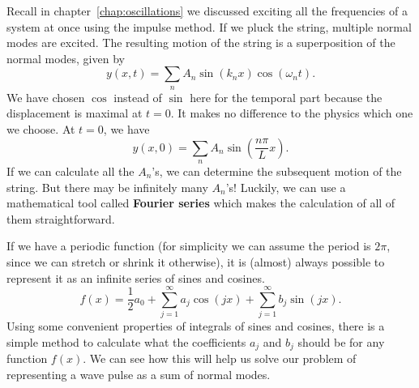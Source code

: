 \documentclass[../classical_mechanics.tex]{subfiles}
\begin{document}
        Recall in chapter~\ref{chap:oscillations} we discussed exciting all the frequencies of a system at once using the impulse method.
        If we pluck the string, multiple normal modes are excited.
        The resulting motion of the string is a superposition of the normal modes, given by
        \begin{equation}
            y(x,t)=\sum_n A_n\sin(k_n x)\cos(\omega_n t).
        \end{equation}
        We have chosen $\cos$ instead of $\sin$ here for the temporal part because the displacement is maximal at $t=0$.
        It makes no difference to the physics which one we choose.
        At $t=0$, we have
        \begin{equation}\label{eq:waves:plucked-string-initial-conditions}
            y(x,0)=\sum_n A_n\sin\left(\frac{n\pi}{L}x\right).
        \end{equation}
        If we can calculate all the $A_n$'s, we can determine the subsequent motion of the string.
        But there may be infinitely many $A_n$'s!
        Luckily, we can use a mathematical tool called \textbf{Fourier series} which makes the calculation of all of them straightforward.

        If we have a periodic function (for simplicity we can assume the period is $2\pi$, since we can stretch or shrink it otherwise), it is (almost) always possible to represent it as an infinite series of sines and cosines.
        \begin{equation}\label{eq:waves:fourier-series}
            f(x)=\frac{1}{2}a_0+\sum_{j=1}^\infty a_j\cos(jx)+\sum_{j=1}^\infty b_j\sin(jx).
        \end{equation}
        Using some convenient properties of integrals of sines and cosines, there is a simple method to calculate what the coefficients $a_j$ and $b_j$ should be for any function $f(x)$.
        We can see how this will help us solve our problem of representing a wave pulse as a sum of normal modes.
\end{document}
